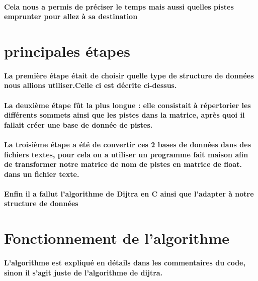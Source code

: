\documentclass [a4] {article}
\begin{document}
\paragraph{Cela nous a permis de préciser le temps mais aussi quelles pistes emprunter pour allez à sa destination}
\section{principales étapes}
\paragraph{La première étape était de choisir quelle type de structure de données nous allions utiliser.Celle ci est décrite ci-dessus.}
\paragraph{La deuxième étape fût la plus longue : elle consistait à répertorier les différents sommets ainsi que les pistes dans la matrice, après quoi il fallait créer une base de donnée de pistes.}
\paragraph{La troisième étape a été de convertir ces 2 bases de données dans des fichiers textes, pour cela on a utiliser un programme fait maison afin de transformer notre matrice de nom de pistes en matrice de float. dans un fichier texte.}
\paragraph{Enfin il a fallut l'algorithme de Dijtra en C ainsi que l'adapter à notre structure de données}                                                                                                                                                                                                                                                                                                                                                                                                                                              
\newpage
\section{Fonctionnement de l'algorithme}
\paragraph{L'algorithme est expliqué en détails dans les commentaires du code, sinon il s'agit juste de l'algorithme de dijtra.}
\end{document}
